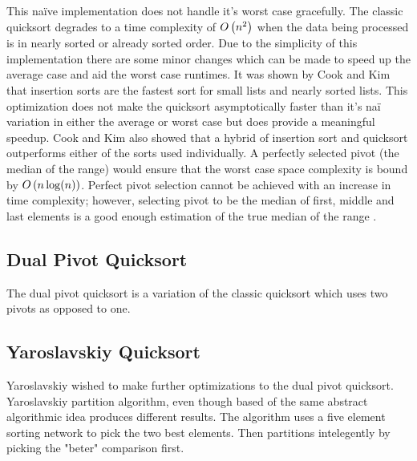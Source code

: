         This na\"{i}ve implementation does not handle it's worst case gracefully. The classic quicksort degrades to a time complexity of $O\left(n^2\right)$ when the data being processed is in nearly sorted or already sorted order. Due to the simplicity of this implementation there are some minor changes which can be made to speed up the average case and aid the worst case runtimes. It was shown by Cook and Kim \cite{cook1980best} that insertion sorts are the fastest sort for small lists and nearly sorted lists. This optimization does not make the quicksort asymptotically faster than it's na\"{i} variation in either the average or worst case but does provide a meaningful speedup. Cook and Kim also showed that a hybrid of insertion sort and quicksort outperforms either of the sorts used individually. A perfectly selected pivot (the median of the range) would ensure that the worst case space complexity is bound by $O\left(n\log(n)\right)$. Perfect pivot selection cannot be achieved with an increase in time complexity; however, selecting pivot to be the median of first, middle and last elements is a good enough estimation of the true median of the range \cite{sedgewick1978implementing}.


	\subsection{Dual Pivot Quicksort}
		\label{subsec:DualPivotQSortIntro}

        The dual pivot quicksort is a variation of the classic quicksort which uses two pivots as opposed to one. 
	
	\subsection{Yaroslavskiy Quicksort}    
        \label{subsec:YaroslavskiyQSortIntro}
		Yaroslavskiy wished to make further optimizations to the dual pivot quicksort. Yaroslavskiy partition algorithm, even though based of the same abstract algorithmic idea produces different results\cite{Wild:2012:ACA:2404160.2404231}. The algorithm uses a five element sorting network to pick the two best elements. Then partitions intelegently by picking the "beter" comparison first\cite{Wild:2012:ACA:2404160.2404231}.
		
